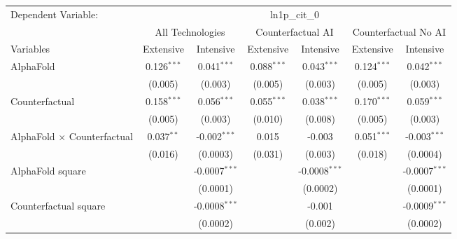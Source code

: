 \begingroup
\centering
\begin{tabular}{lcccccc}
   \tabularnewline \midrule \midrule
   Dependent Variable: & \multicolumn{6}{c}{ln1p\_cit\_0}\\
 & \multicolumn{2}{c}{All Technologies} & \multicolumn{2}{c}{Counterfactual AI} & \multicolumn{2}{c}{Counterfactual No AI} \\
\cmidrule(lr){1-1}\cmidrule(lr){2-3} \cmidrule(lr){4-5} \cmidrule(lr){6-7}
Variables & \multicolumn{1}{c}{Extensive} & \multicolumn{1}{c}{Intensive} & \multicolumn{1}{c}{Extensive} & \multicolumn{1}{c}{Intensive} & \multicolumn{1}{c}{Extensive} & \multicolumn{1}{c}{Intensive} \\
\cmidrule(lr){1-1}\cmidrule(lr){2-2} \cmidrule(lr){3-3} \cmidrule(lr){4-4} \cmidrule(lr){5-5} \cmidrule(lr){6-6} \cmidrule(lr){7-7}
   AlphaFold                          & 0.126$^{***}$ & 0.041$^{***}$     & 0.088$^{***}$ & 0.043$^{***}$   & 0.124$^{***}$ & 0.042$^{***}$\\   
                                      & (0.005)       & (0.003)           & (0.005)       & (0.003)         & (0.005)       & (0.003)\\   
   Counterfactual                     & 0.158$^{***}$ & 0.056$^{***}$     & 0.055$^{***}$ & 0.038$^{***}$   & 0.170$^{***}$ & 0.059$^{***}$\\   
                                      & (0.005)       & (0.003)           & (0.010)       & (0.008)         & (0.005)       & (0.003)\\   
   AlphaFold $\times$ Counterfactual  & 0.037$^{**}$  & -0.002$^{***}$    & 0.015         & -0.003          & 0.051$^{***}$ & -0.003$^{***}$\\   
                                      & (0.016)       & (0.0003)          & (0.031)       & (0.003)         & (0.018)       & (0.0004)\\   
   AlphaFold square                   &               & -0.0007$^{***}$   &               & -0.0008$^{***}$ &               & -0.0007$^{***}$\\   
                                      &               & (0.0001)          &               & (0.0002)        &               & (0.0001)\\   
   Counterfactual square              &               & -0.0008$^{***}$   &               & -0.001          &               & -0.0009$^{***}$\\   
                                      &               & (0.0002)          &               & (0.002)         &               & (0.0002)\\   

\end{tabular}
